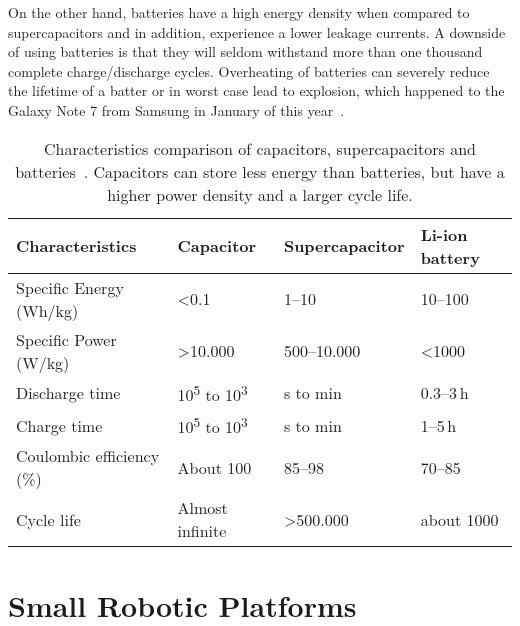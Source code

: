 On the other hand, batteries have a high energy density when compared to supercapacitors and in addition, experience a lower leakage currents.
A downside of using batteries is that they will seldom withstand more than one thousand complete charge/discharge cycles.
Overheating of batteries can severely reduce the lifetime of a batter or in worst case lead to explosion, which happened to the Galaxy Note 7 from Samsung in January of this year~\cite{samsung_note7_2017}.



\begin{table}[t]
	\centering
	\caption{Characteristics comparison of capacitors, supercapacitors and batteries~\cite{Gonzalez_rser_2016}. Capacitors can store less energy than batteries, but have a higher power density and a larger cycle life.}
	\label{tab:cap_scap_battery}
	\small
	\begin{tabular}{|l||l|l|l|}
		\hline
		Characteristics & Capacitor & Supercapacitor & Li-ion battery \\
		\hline \hline
		Specific Energy (Wh/kg) & \textless 0.1 & 1--10 & 10--100 \\
		Specific Power (W/kg) & \textgreater 10.000 & 500--10.000 & \textless 1000 \\
		Discharge time & 10\textsuperscript{5} to 10\textsuperscript{3} & s to min & 0.3--3\,h \\
		Charge time & 10\textsuperscript{5} to 10\textsuperscript{3} & s to min & 1--5\,h \\
		Coulombic efficiency (\%) & About 100 & 85--98 & 70--85 \\
		Cycle life & Almost infinite & \textgreater 500.000 & about 1000 \\
		\hline
	\end{tabular}
\end{table}


\section{Small Robotic Platforms}
\label{sec:rw_robotic_platforms}

